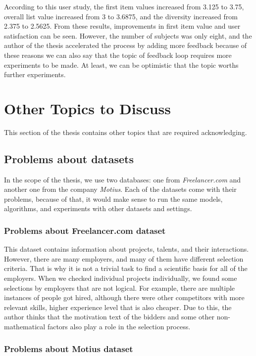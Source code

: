 According to this user study, the first item values increased from 3.125 to 3.75, overall list value increased from 3 to 3.6875, and the diversity increased from 2.375 to 2.5625. From these results, improvements in first item value and user satisfaction can be seen. However, the number of subjects was only eight, and the author of the thesis accelerated the process by adding more feedback because of these reasons we can also say that the topic of feedback loop requires more experiments to be made. At least, we can be optimistic that the topic worths further experiments.

\section{Other Topics to Discuss}

This section of the thesis contains other topics that are required acknowledging.

\subsection{Problems about datasets}

In the scope of the thesis, we use two databases: one from \textit{Freelancer.com} and another one from the company \textit{Motius}. Each of the datasets come with their problems, because of that, it would make sense to run the same models, algorithms, and experiments with other datasets and settings.

\subsubsection{Problems about Freelancer.com dataset}

This dataset contains information about projects, talents, and their interactions. However, there are many employers, and many of them have different selection criteria. That is why it is not a trivial task to find a scientific basis for all of the employers. When we checked individual projects individually, we found some selections by employers that are not logical. For example, there are multiple instances of people got hired, although there were other competitors with more relevant skills, higher experience level that is also cheaper. Due to this, the author thinks that the motivation text of the bidders and some other non-mathematical factors also play a role in the selection process. 

\subsubsection{Problems about Motius dataset}


